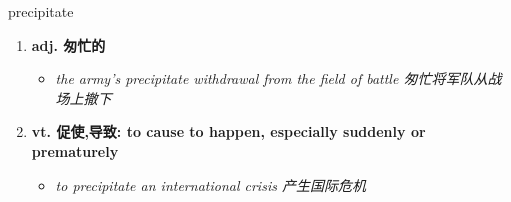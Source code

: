 
\begin{frame}
{\huge precipitate}
\begin{center}
\begin{enumerate}\Large
  \item \textbf{adj. 匆忙的}
  \begin{itemize}
    \item \em{\Large{the army's precipitate withdrawal from the field of battle 匆忙将军队从战场上撤下}}
  \end{itemize}
  \item \textbf{vt. 促使,导致: to cause to happen, especially suddenly or prematurely}
  \begin{itemize}
    \item \em{\Large{to precipitate an international crisis 产生国际危机}}
  \end{itemize}
\end{enumerate}
\end{center}
\end{frame}
